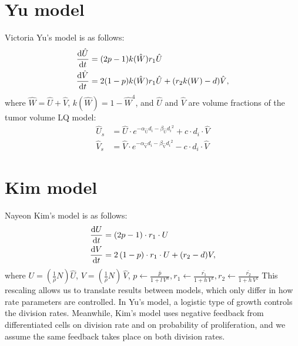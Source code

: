 \documentclass[12pt]{article}
\begin{document}
\section*{Yu model}
Victoria Yu's model is as follows:
\begin{align*}
\dv{\hat{U}}{t} &= (2p-1)k(\hat{W})r_1\hat{U}\\
\dv{\hat{V}}{t} &= 2(1-p)k(\hat{W})r_1\hat{U} + (r_2k(W)-d)\hat{V},
\end{align*}
where $\hat{W}=\hat{U}+\hat{V}$, $k(\hat{W})=1-\hat{W}^4$, and $\hat{U}$ and $\hat{V}$ are volume fractions of the tumor volume
LQ model:
\begin{align*}
\hat{U}_s &= \hat{U}\cdot e^{-\alpha_{\hat{\text{U}}}{d_i}-\beta_{\hat{\text{U}}}{d_i}^2} + c\cdot d_i\cdot \hat{V}\\
\hat{V}_s &= \hat{V}\cdot e^{-\alpha_{\hat{
\text{V}}}{d_i}-\beta_{\hat{\text{V}}}{d_i}^2}
 - c\cdot d_i\cdot \hat{V}
\end{align*}
\section*{Kim model}
Nayeon Kim's model is as follows:
\begin{align*}
\dv{U}{t} &= \left(2p-1\right)\cdot r_1\cdot U\\
\dv{V}{t}&=2\left(1-p\right)\cdot r_1\cdot U+(r_2-d)V,
\end{align*}
where $U = \left(\frac{1}{\rho}N\right)\hat{U}$, $V = \left(\frac{1}{\rho}N\right)\,\hat{V}$, $p\leftarrow \frac{\bar{p}}{1+l\,V^n},r_1\leftarrow \frac{\bar{r_1}}{1+h\,V^z},r_2\leftarrow \frac{\bar{r_2}}{1+h\,V^z}$ This rescaling allows us to translate results between models, which only differ in how rate parameters are controlled. In Yu's model, a logistic type of growth controls the division rates. Meanwhile, Kim's model uses negative feedback from differentiated cells on division rate and on probability of proliferation, and we assume the same feedback takes place on both division rates.
\end{document}
